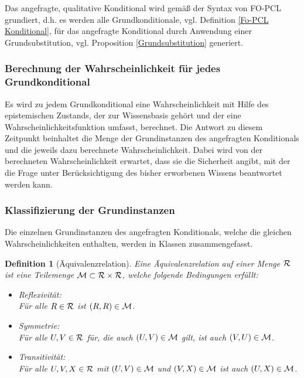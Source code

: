 \documentclass[a4paper, 11pt]{book}
\newtheorem{Def}{Definition }[section]
\begin{document}
Das angefragte, qualitative Konditional wird gemäß der Syntax von FO-PCL grundiert, d.h. es werden alle Grundkonditionale, vgl. Definition \ref{Fo-PCL Konditional}, für das angefragte Konditional durch Anwendung einer Grundsubstitution, vgl. Proposition \ref{Grundsubstitution} generiert.

\subsubsection{Berechnung der Wahrscheinlichkeit für jedes Grundkonditional}
Es wird zu jedem Grundkonditional eine Wahrscheinlichkeit mit Hilfe des epistemischen Zustands, der zur Wissensbasis gehört und der eine Wahrscheinlichkeitsfunktion umfasst, berechnet. Die Antwort zu diesem Zeitpunkt beinhaltet die Menge der Grundinstanzen des angefragten Konditionals und die jeweils dazu berechnete Wahrscheinlichkeit. Dabei wird von der berechneten Wahrscheinlichkeit erwartet, dass sie die Sicherheit angibt, mit der die Frage unter Berücksichtigung des bisher erworbenen Wissens beantwortet werden kann.
	
\subsubsection{Klassifizierung der Grundinstanzen} 
Die einzelnen Grundinstanzen des angefragten Konditionals, welche die gleichen Wahrscheinlichkeiten enthalten, werden in Klassen zusammengefasst.

\begin{Def}[Äquivalenzrelation] \label{Äquivalenzrelation}
Eine Äquivalenzrelation auf einer Menge $ \cal{R} $  ist eine Teilemenge $ \cal{M} \subset \cal{R} \times \cal{R}$, welche folgende Bedingungen erfüllt:
\begin{itemize}
	\item Reflexivität:\\
	 Für alle $ R \in \cal{R} $ ist $ (R,R) \in \cal{M} $.
	\item Symmetrie: \\
	Für alle $ U,V \in \cal{R} $ für, die auch  $ (U,V) \in \cal{M} $ gilt, ist auch  $ (V,U) \in \cal{M} $.
	\item  Transitivität:\\
	Für alle $ U,V,X  \in \cal{R} $ mit $ (U,V) \in \cal{M} $ und $ (V,X) \in \cal{M} $ ist auch $ (U,X) \in \cal{M} $.
\end{itemize}
\end{Def}
\end{document}
